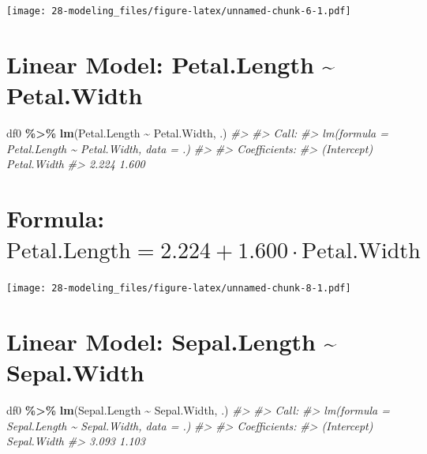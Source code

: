 \documentclass[
  xelatex, ja=standard]{bxjsbook}
\newenvironment{Shaded}{\begin{snugshade}}{\end{snugshade}}
\newcommand{\CommentTok}[1]{\textcolor[rgb]{0.56,0.35,0.01}{\textit{#1}}}
\newcommand{\FunctionTok}[1]{\textcolor[rgb]{0.13,0.29,0.53}{\textbf{#1}}}
\newcommand{\NormalTok}[1]{#1}
\newcommand{\SpecialCharTok}[1]{\textcolor[rgb]{0.81,0.36,0.00}{\textbf{#1}}}
\theoremstyle{definition}
\theoremstyle{definition}
\theoremstyle{definition}
\theoremstyle{definition}
\theoremstyle{remark}
\begin{document}
\texttt{[image: 28-modeling\_files/figure-latex/unnamed-chunk-6-1.pdf]}

\hypertarget{linear-model-petal.length-petal.width}{%
\section{Linear Model: Petal.Length \textasciitilde{} Petal.Width}\label{linear-model-petal.length-petal.width}}

\begin{Shaded}
\begin{Highlighting}[]
\NormalTok{df0 }\SpecialCharTok{\%\textgreater{}\%} \FunctionTok{lm}\NormalTok{(Petal.Length }\SpecialCharTok{\textasciitilde{}}\NormalTok{ Petal.Width, .)}
\CommentTok{\#\textgreater{} }
\CommentTok{\#\textgreater{} Call:}
\CommentTok{\#\textgreater{} lm(formula = Petal.Length \textasciitilde{} Petal.Width, data = .)}
\CommentTok{\#\textgreater{} }
\CommentTok{\#\textgreater{} Coefficients:}
\CommentTok{\#\textgreater{} (Intercept)  Petal.Width  }
\CommentTok{\#\textgreater{}       2.224        1.600}
\end{Highlighting}
\end{Shaded}

\hypertarget{formula-textpetal.length-2.224-1.600cdot-textpetal.width}{%
\section{\texorpdfstring{Formula: \(\text{Petal.Length} = 2.224 + 1.600\cdot \text{Petal.Width}\)}{Formula: \textbackslash text\{Petal.Length\} = 2.224 + 1.600\textbackslash cdot \textbackslash text\{Petal.Width\}}}\label{formula-textpetal.length-2.224-1.600cdot-textpetal.width}}

\texttt{[image: 28-modeling\_files/figure-latex/unnamed-chunk-8-1.pdf]}

\hypertarget{linear-model-sepal.length-sepal.width}{%
\section{Linear Model: Sepal.Length \textasciitilde{} Sepal.Width}\label{linear-model-sepal.length-sepal.width}}

\begin{Shaded}
\begin{Highlighting}[]
\NormalTok{df0 }\SpecialCharTok{\%\textgreater{}\%} \FunctionTok{lm}\NormalTok{(Sepal.Length }\SpecialCharTok{\textasciitilde{}}\NormalTok{ Sepal.Width, .)}
\CommentTok{\#\textgreater{} }
\CommentTok{\#\textgreater{} Call:}
\CommentTok{\#\textgreater{} lm(formula = Sepal.Length \textasciitilde{} Sepal.Width, data = .)}
\CommentTok{\#\textgreater{} }
\CommentTok{\#\textgreater{} Coefficients:}
\CommentTok{\#\textgreater{} (Intercept)  Sepal.Width  }
\CommentTok{\#\textgreater{}       3.093        1.103}
\end{Highlighting}
\end{Shaded}
\end{document}
